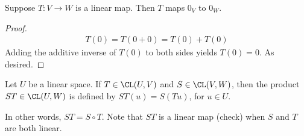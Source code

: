 \documentclass{article}
\begin{document}
  \begin{prop}
    Suppose $T: V \to W$ is a linear map. Then $T$ maps $0_V$ to $0_W$.
  \end{prop}
  \begin{proof}
    \begin{align*}
      T(0) = T(0 + 0) = T(0) + T(0)
    \end{align*}
    Adding the additive inverse of $T(0)$ to both sides yields $T(0) = 0$. As desired.
  \end{proof}
  \begin{defn}
    Let $U$ be a linear space. If $T \in \CL(U, V)$ and $S \in \CL(V, W)$, then the product $ST \in \CL(U, W)$ is defined by $ST(u) = S(Tu)$, for $u \in U$. 
  \end{defn}
  In other words, $ST = S \circ T$. Note that $ST$ is a linear map (check) when $S$ and $T$ are both linear.
\end{document}
